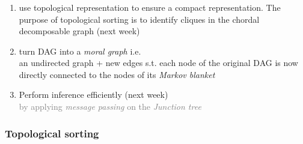 \begin{frame}\frametitle{\subsecname}
    
    \begin{enumerate}
     \item use topological representation to ensure a compact representation.
     The purpose of topological sorting is to identify cliques in the chordal decomposable graph (next week)
     \item turn DAG into a \emph{moral graph} i.e. \\
     an undirected graph + new edges s.t. each node of the original DAG is now directly connected to the nodes of its \emph{Markov blanket}
     \item Perform inference efficiently (next week)\\
     \textcolor{gray}{ by applying \emph{message passing} on the \emph{Junction tree}}
    \end{enumerate}
    
\end{frame}

\subsubsection{Topological sorting}


